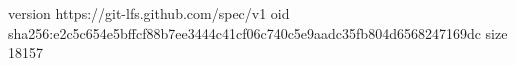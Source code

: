 version https://git-lfs.github.com/spec/v1
oid sha256:e2c5c654e5bffcf88b7ee3444c41cf06c740c5e9aadc35fb804d6568247169dc
size 18157
